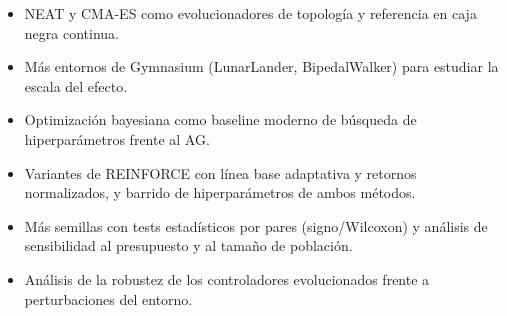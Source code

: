 \begin{itemize}
  \item NEAT \citep{stanley2002} y CMA-ES \citep{hansen2001} como evolucionadores de topología y referencia en caja negra continua.
  \item Más entornos de Gymnasium (LunarLander, BipedalWalker) para estudiar la escala del efecto.
  \item Optimización bayesiana \citep{snoek2012} como baseline moderno de búsqueda de hiperparámetros frente al AG.
  \item Variantes de REINFORCE con línea base adaptativa y retornos normalizados, y barrido de hiperparámetros de ambos métodos.
  \item Más semillas con tests estadísticos por pares (signo/Wilcoxon) y análisis de sensibilidad al presupuesto y al tamaño de población.
  \item Análisis de la robustez de los controladores evolucionados frente a perturbaciones del entorno.
\end{itemize}
